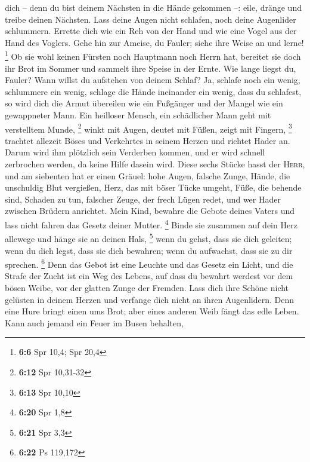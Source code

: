dich -- denn du bist deinem Nächsten in die Hände gekommen --: eile,
dränge und treibe deinen Nächsten.  Lass deine Augen nicht
schlafen, noch deine Augenlider schlummern.  Errette dich
wie ein Reh von der Hand und wie eine Vogel aus der Hand des Voglers.
 Gehe hin zur Ameise, du Fauler; siehe ihre Weise an und
lerne! \footnote{\textbf{6:6} Spr 10,4; Spr 20,4}  Ob sie
wohl keinen Fürsten noch Hauptmann noch Herrn hat, 
bereitet sie doch ihr Brot im Sommer und sammelt ihre Speise in der
Ernte.  Wie lange liegst du, Fauler? Wann willst du
aufstehen von deinem Schlaf?  Ja, schlafe noch ein wenig,
schlummere ein wenig, schlage die Hände ineinander ein wenig, dass du
schlafest,  so wird dich die Armut übereilen wie ein
Fußgänger und der Mangel wie ein gewappneter Mann.  Ein
heilloser Mensch, ein schädlicher Mann geht mit verstelltem Munde,
\footnote{\textbf{6:12} Spr 10,31-32}  winkt mit Augen,
deutet mit Füßen, zeigt mit Fingern, \footnote{\textbf{6:13} Spr 10,10}
 trachtet allezeit Böses und Verkehrtes in seinem Herzen
und richtet Hader an.  Darum wird ihm plötzlich sein
Verderben kommen, und er wird schnell zerbrochen werden, da keine Hilfe
dasein wird.  Diese sechs Stücke hasst der \textsc{Herr},
und am siebenten hat er einen Gräuel:  hohe Augen,
falsche Zunge, Hände, die unschuldig Blut vergießen, 
Herz, das mit böser Tücke umgeht, Füße, die behende sind, Schaden zu
tun,  falscher Zeuge, der frech Lügen redet, und wer
Hader zwischen Brüdern anrichtet.  Mein Kind, bewahre die
Gebote deines Vaters und lass nicht fahren das Gesetz deiner Mutter.
\footnote{\textbf{6:20} Spr 1,8}  Binde sie zusammen auf
dein Herz allewege und hänge sie an deinen Hals, \footnote{\textbf{6:21}
  Spr 3,3}  wenn du gehst, dass sie dich geleiten; wenn
du dich legst, dass sie dich bewahren; wenn du aufwachst, dass sie zu
dir sprechen. \footnote{\textbf{6:22} Ps 119,172}  Denn
das Gebot ist eine Leuchte und das Gesetz ein Licht, und die Strafe der
Zucht ist ein Weg des Lebens,  auf dass du bewahrt
werdest vor dem bösen Weibe, vor der glatten Zunge der Fremden.
 Lass dich ihre Schöne nicht gelüsten in deinem Herzen
und verfange dich nicht an ihren Augenlidern.  Denn eine
Hure bringt einen ums Brot; aber eines anderen Weib fängt das edle
Leben.  Kann auch jemand ein Feuer im Busen behalten,

